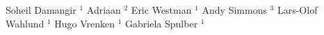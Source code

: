 Soheil Damangir $^1$
Adriaan $^2$
Eric Westman $^1$ 
Andy Simmons $^3$
Lars-Olof Wahlund $^1$
Hugo Vrenken $^1$
Gabriela Spulber $^1$
  
  